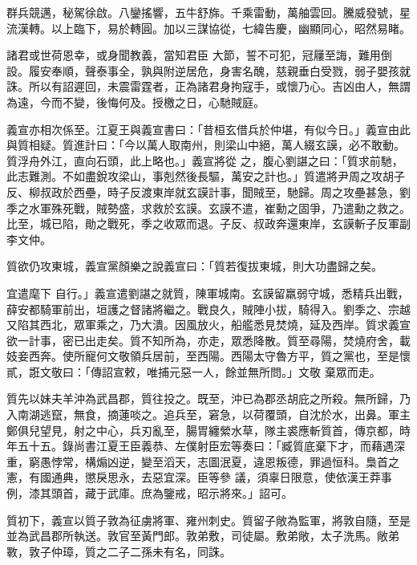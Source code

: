 \begin{pinyinscope}
 群兵競邁，秘駕徐啟。八鑾搖響，五牛舒旆。千乘雷動，萬舳雲回。騰威發號，星流漢轉。以上臨下，易於轉圓。加以三謀協從，七緯告慶，幽顯同心，昭然易睹。



 諸君或世荷恩幸，或身聞教義，當知君臣
 大節，誓不可犯，冠屨至誨，難用倒設。履安奉順，聲泰事全，孰與附逆居危，身害名醜，慈親垂白受戮，弱子嬰孩就誅。所以有詔遲回，未震雷霆者，正為諸君身拘寇手，或懷乃心。吉凶由人，無謂為遠，今而不變，後悔何及。授檄之日，心馳賊庭。



 義宣亦相次係至。江夏王與義宣書曰：「昔桓玄借兵於仲堪，有似今日。」義宣由此與質相疑。質進計曰：「今以萬人取南州，則梁山中絕，萬人綴玄謨，必不敢動。質浮舟外江，直向石頭，此上略也。」義宣將從
 之，腹心劉諶之曰：「質求前馳，此志難測。不如盡銳攻梁山，事剋然後長驅，萬安之計也。」質遣將尹周之攻胡子反、柳叔政於西壘，時子反渡東岸就玄謨計事，聞賊至，馳歸。周之攻壘甚急，劉季之水軍殊死戰，賊勢盛，求救於玄謨。玄謨不遣，崔勳之固爭，乃遣勳之救之。比至，城已陷，勛之戰死，季之收眾而退。子反、叔政奔還東岸，玄謨斬子反軍副李文仲。



 質欲仍攻東城，義宣黨顏樂之說義宣曰：「質若復拔東城，則大功盡歸之矣。



 宜遣麾下
 自行。」義宣遣劉諶之就質，陳軍城南。玄謨留羸弱守城，悉精兵出戰，薛安都騎軍前出，垣護之督諸將繼之。戰良久，賊陣小拔，騎得入。劉季之、宗越又陷其西北，眾軍乘之，乃大潰。因風放火，船艦悉見焚燒，延及西岸。質求義宣欲一計事，密已出走矣。質不知所為，亦走，眾悉降散。質至尋陽，焚燒府舍，載妓妾西奔。使所寵何文敬領兵居前，至西陽。西陽太守魯方平，質之黨也，至是懷貳，誑文敬曰：「傳詔宣敕，唯捕元惡一人，餘並無所問。」文敬
 棄眾而走。



 質先以妹夫羊沖為武昌郡，質往投之。既至，沖已為郡丞胡庇之所殺。無所歸，乃入南湖逃竄，無食，摘蓮啖之。追兵至，窘急，以荷覆頭，自沈於水，出鼻。軍主鄭俱兒望見，射之中心，兵刃亂至，腸胃纏縈水草，隊主裘應斬質首，傳京都，時年五十五。錄尚書江夏王臣義恭、左僕射臣宏等奏曰：「臧質底棄下才，而藉遇深重，窮愚悖常，構煽凶逆，變至滔天，志圖泯夏，違恩叛德，罪過恒科。梟首之憲，有國通典，懲戾思永，去惡宜深。臣等參
 議，須辜日限意，使依漢王莽事例，漆其頭首，藏于武庫。庶為鑒戒，昭示將來。」詔可。



 質初下，義宣以質子敦為征虜將軍、雍州刺史。質留子敞為監軍，將敦自隨，至是並為武昌郡所執送。敦官至黃門郎。敦弟敷，司徒屬。敷弟敞，太子洗馬。敞弟斁，敦子仲璋，質之二子二孫未有名，同誅。




\end{pinyinscope}
